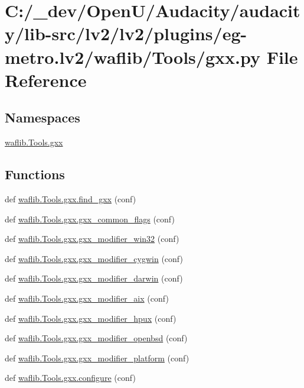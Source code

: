 \hypertarget{lv2_2plugins_2eg-metro_8lv2_2waflib_2_tools_2gxx_8py}{}\section{C\+:/\+\_\+dev/\+Open\+U/\+Audacity/audacity/lib-\/src/lv2/lv2/plugins/eg-\/metro.lv2/waflib/\+Tools/gxx.py File Reference}
\label{lv2_2plugins_2eg-metro_8lv2_2waflib_2_tools_2gxx_8py}
\subsection*{Namespaces}
\begin{DoxyCompactItemize}
\item 
 \hyperlink{namespacewaflib_1_1_tools_1_1gxx}{waflib.\+Tools.\+gxx}
\end{DoxyCompactItemize}
\subsection*{Functions}
\begin{DoxyCompactItemize}
\item 
def \hyperlink{namespacewaflib_1_1_tools_1_1gxx_a429b712dd222e6e975da527c68c08ba8}{waflib.\+Tools.\+gxx.\+find\+\_\+gxx} (conf)
\item 
def \hyperlink{namespacewaflib_1_1_tools_1_1gxx_a86410b2f6bcf01791c43e27ddebf3080}{waflib.\+Tools.\+gxx.\+gxx\+\_\+common\+\_\+flags} (conf)
\item 
def \hyperlink{namespacewaflib_1_1_tools_1_1gxx_a5161aa30bcb691ffeb6b39da4b9b2b62}{waflib.\+Tools.\+gxx.\+gxx\+\_\+modifier\+\_\+win32} (conf)
\item 
def \hyperlink{namespacewaflib_1_1_tools_1_1gxx_a70609bea69338d82affec21284c6c5dc}{waflib.\+Tools.\+gxx.\+gxx\+\_\+modifier\+\_\+cygwin} (conf)
\item 
def \hyperlink{namespacewaflib_1_1_tools_1_1gxx_afb73b72b4db84fa412549484f754901e}{waflib.\+Tools.\+gxx.\+gxx\+\_\+modifier\+\_\+darwin} (conf)
\item 
def \hyperlink{namespacewaflib_1_1_tools_1_1gxx_aae0a6b0cc6273670e94d02a1601481ca}{waflib.\+Tools.\+gxx.\+gxx\+\_\+modifier\+\_\+aix} (conf)
\item 
def \hyperlink{namespacewaflib_1_1_tools_1_1gxx_a5862cdb93d3572914361f8f6261e8a18}{waflib.\+Tools.\+gxx.\+gxx\+\_\+modifier\+\_\+hpux} (conf)
\item 
def \hyperlink{namespacewaflib_1_1_tools_1_1gxx_a6915c3fe47d85e1eca7787adfc24e570}{waflib.\+Tools.\+gxx.\+gxx\+\_\+modifier\+\_\+openbsd} (conf)
\item 
def \hyperlink{namespacewaflib_1_1_tools_1_1gxx_a8ac4de3cf5a92e00e8c75e1272521afa}{waflib.\+Tools.\+gxx.\+gxx\+\_\+modifier\+\_\+platform} (conf)
\item 
def \hyperlink{namespacewaflib_1_1_tools_1_1gxx_aaf1ce44a59356fa376d25557d760bf6a}{waflib.\+Tools.\+gxx.\+configure} (conf)
\end{DoxyCompactItemize}
